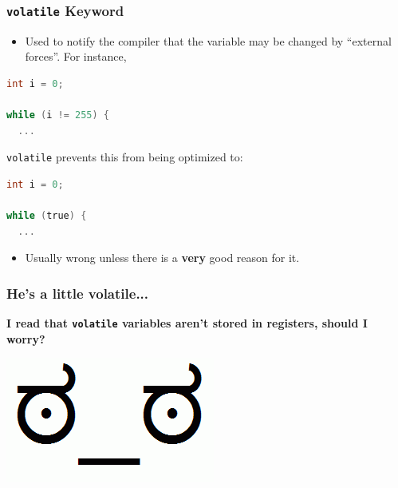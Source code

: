 \begin{frame}[fragile]
  \frametitle{{\tt volatile} Keyword}


  \begin{itemize}
    \item Used to notify the compiler that the variable may be changed by ``external forces''. For instance,
  \end{itemize}

  \begin{lstlisting}[language=C]
int i = 0;

while (i != 255) {
  ...
  \end{lstlisting}

{\tt volatile} prevents this from being optimized to:

  \begin{lstlisting}[language=C]
int i = 0;

while (true) {
  ...
  \end{lstlisting}

  \begin{itemize}
    \item Usually wrong unless there is a {\bf very} good reason for it.
  \end{itemize}


\end{frame}

\begin{frame}[fragile]
  \frametitle{He's a little volatile...}

  
  {\bf I read that {\tt volatile} variables aren't stored in registers,
     should I worry?}
  \vspace{6.2em}
  \pause

  \begin{center}
    \includegraphics[scale=0.3]{images/disapproval}    
  \end{center}
  
\end{frame}


